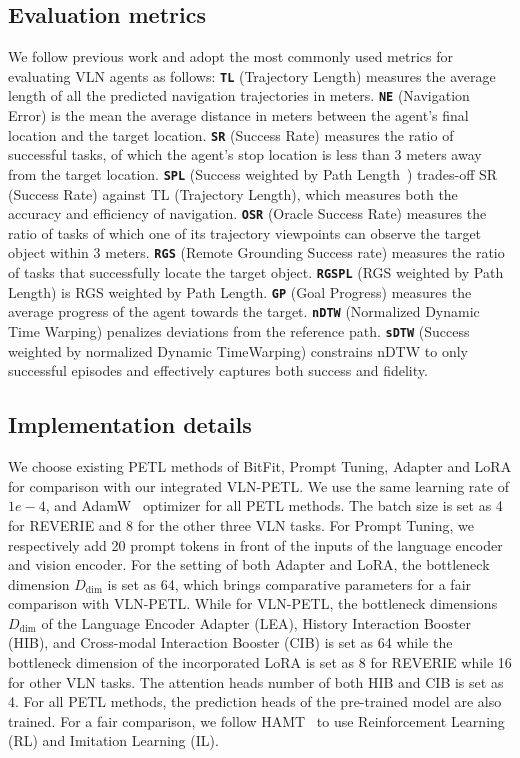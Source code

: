 \documentclass[10pt,twocolumn,letterpaper]{article}
\begin{document}
\subsection{Evaluation metrics}
We follow previous work and adopt the most commonly used metrics for evaluating VLN agents as follows: \textbf{\texttt{TL}} (Trajectory Length) measures the average length of all the predicted navigation trajectories in meters. 
\textbf{\texttt{NE}} (Navigation Error) is the mean the average distance in meters between the agent's final location and the target location. 
\textbf{\texttt{SR}} (Success Rate) measures the ratio of successful tasks, of which the agent's stop location is less than 3 meters away from the target location.
\textbf{\texttt{SPL}} (Success weighted by Path Length~\cite{spl}) trades-off SR (Success Rate) against TL (Trajectory Length), which measures both the accuracy and efficiency of navigation. \textbf{\texttt{OSR}} (Oracle Success Rate) measures the ratio of tasks of which one of its trajectory viewpoints can observe the target object within 3 meters. 
\textbf{\texttt{RGS}} (Remote Grounding Success rate) measures the ratio of tasks that successfully locate the target object.
\textbf{\texttt{RGSPL}} (RGS weighted by Path Length) is RGS weighted by Path Length.
\textbf{\texttt{GP}} (Goal Progress) measures the average progress of the agent towards the target.
\textbf{\texttt{nDTW}} (Normalized Dynamic
Time Warping) penalizes deviations from the reference path.
\textbf{\texttt{sDTW}} (Success weighted by normalized Dynamic TimeWarping) constrains nDTW to only successful episodes and effectively captures both success and fidelity.

\subsection{Implementation details}
We choose existing PETL methods of BitFit, Prompt Tuning, Adapter and LoRA for comparison with our integrated VLN-PETL. We use the same learning rate of $1e-4$, and AdamW~\cite{adamw} optimizer for all PETL methods. The batch size is set as 4 for REVERIE and 8 for the other three VLN tasks. For Prompt Tuning, we respectively add 20 prompt tokens in front of the inputs of the language encoder and vision encoder. For the setting of both Adapter and LoRA, the bottleneck dimension $D_\text{dim}$ is set as 64, which brings comparative parameters for a fair comparison with VLN-PETL. While for VLN-PETL, the bottleneck dimensions $D_\text{dim}$ of the Language Encoder Adapter (LEA), History Interaction Booster (HIB), and Cross-modal Interaction Booster (CIB) is set as 64 while the bottleneck dimension of the incorporated LoRA is set as 8 for REVERIE while 16 for other VLN tasks. The attention heads number of both HIB and CIB is set as 4. For all PETL methods, the prediction heads of the pre-trained model are also trained. 
For a fair comparison, we follow HAMT~\cite{hamt} to use Reinforcement Learning (RL) and Imitation Learning (IL).
\end{document}
